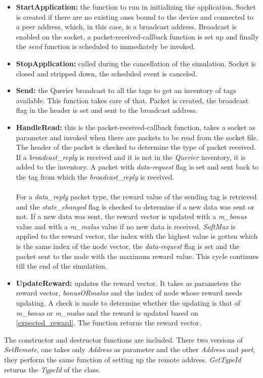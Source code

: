 \begin{itemize}
    \renewcommand{\labelitemi}{}
\item \textbf{StartApplication:} the function to run in initializing the application.
    Socket is created if there are no existing ones bound to the device and connected
    to a peer address, which, in this case, is a broadcast address. Broadcast is
    enabled on the socket, a packet-received-callback function is set up and 
    finally the \textit{send} function is scheduled to immediately be invoked.
\item \textbf{StopApplication:} called during the cancellation of the simulation.
    Socket is closed and stripped down, the scheduled event is canceled.
\item \textbf{Send:} the Querier broadcast to all the tags to get an inventory of
    tags available. This function takes care of that. Packet is created, the broadcast
    flag in the header is set and sent to the broadcast address.
\item \textbf{HandleRead:} this is the packet-received-callback function, takes a
    socket as parameter and invoked when there are packets to be read from the socket
    file. The header of the packet is checked to determine the type of packet received.
    If a \textit{broadcast\_reply} is received and it is not in the \textit{Querier}
    inventory, it is added to the inventory. A packet with \textit{data-request} flag
    is set and sent back to the tag from which the \textit{broadcast\_reply} is 
    received.\\\\
    For a \textit{data\_reply} packet type, the reward value of the sending tag is
    retrieved and the \textit{state\_changed} flag is checked to determine if a new
    data was sent or not. If a new data was sent, the reward vector is updated with a
    \textit{m\_bonus} value and with a \textit{m\_malus} value if no new data is
    received. \textit{SoftMax} is applied to the reward vector, the index with the
    highest value is gotten which is the same index of the node vector, the 
    \textit{data-request} flag is set and the packet sent to the node with the
    maximum reward value. This cycle continues till the end of the simulation.
\item \textbf{UpdateReward:} updates the reward vector. It takes as parameters the
    reward vector, \textit{bonusORmalus} and the index of node whose reward needs
    updating. A check is made to determine whether the updating is that of 
    \textit{m\_bonus} or \textit{m\_malus} and the reward is updated based on
    \ref{expected_reward}. The function returns the reward vector.
\end{itemize}
The constructor and destructor functions are included. There two versions of
\textit{SetRemote}, one takes only \textit{Address} as parameter and the other
\textit{Address} and \textit{port}, they perform the same function of setting up the
remote address. \textit{GetTypeId} returns the \textit{TypeId} of the class.\\\\

